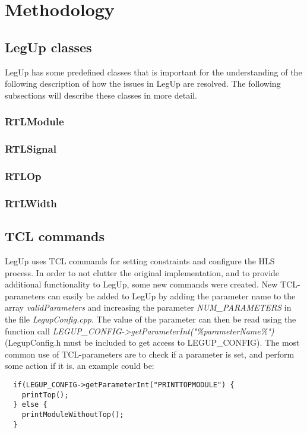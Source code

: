 \chapter{Methodology}

\section{LegUp classes}
LegUp has some predefined classes that is important for the understanding of the following description of how the issues in LegUp are resolved. The following subsections will describe these classes in more detail.
\subsection{RTLModule}

\subsection{RTLSignal}

\subsection{RTLOp}

\subsection{RTLWidth}

\section{TCL commands}
LegUp uses TCL commands for setting constraints and configure the HLS process. In order to not clutter the original implementation, and to provide additional functionality to LegUp, some new commands were created. New TCL-parameters can easily be added to LegUp by adding the parameter name to the array \textit{validParameters} and increasing the parameter \textit{NUM\_PARAMETERS} in the file \textit{LegupConfig.cpp}. The value of the parameter can then be read using the function call \textit{LEGUP\_CONFIG->getParameterInt("\%parameterName\%")} (LegupConfig.h must be included to get access to LEGUP\_CONFIG). The most common use of TCL-parameters are to check if a parameter is set, and perform some action if it is. an example could be:
\begin{verbatim}
  if(LEGUP_CONFIG->getParameterInt("PRINTTOPMODULE") {
    printTop();
  } else {
    printModuleWithoutTop();
  }
\end{verbatim}


